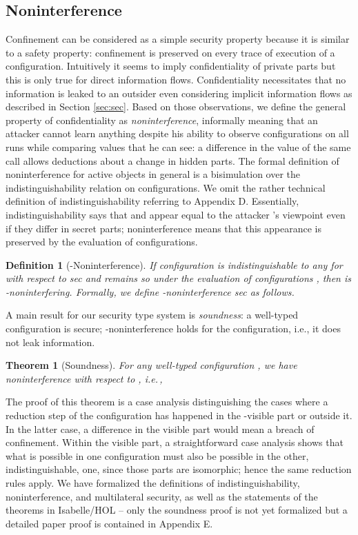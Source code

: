 \documentclass[10pt, conference, compsocconf]{IEEEtran}
\newcommand\ie{i.e.\!\,, }
\newtheorem{theorem}{Theorem}
\newtheorem{definition}{Definition}[section]
\begin{document}
{\subsection{Noninterference}
Confinement can be considered as a simple security property because it 
is similar to a safety property:
confinement is preserved on every trace of execution of a configuration. Intuitively it seems to imply confidentiality of private parts but this is only true 
for direct information flows.
Confidentiality necessitates that no information is leaked to an outsider even considering implicit information flows as 
described in Section \ref{sec:sec}. Based on those observations, we define the general property 
of confidentiality as {\it noninterference}, informally meaning that an attacker cannot learn anything despite
his ability to observe configurations on all runs while comparing values that he can see: a difference
in the value of the same call allows deductions about a change in hidden parts. The formal 
definition of noninterference for active objects in general \cite{kam:12}
is a bisimulation over the indistinguishability 
relation  on configurations. We omit the rather technical definition of indistinguishability 
referring to Appendix D. Essentially, indistinguishability says that  and  appear equal to the 
attacker 's viewpoint  
even if they differ in secret parts; noninterference means that this appearance is preserved by the evaluation of configurations. 
\begin{definition}[-Noninterference]
\label{def:ni}
If configuration  is indistinguishable to any  for  with respect to {\it sec} 
and remains so under the evaluation of configurations , 
then  is -noninterfering.
Formally, we define -noninterference  {\it sec} as follows.

\end{definition}
A main result for our security type system is {\it soundness}: a well-typed configuration is secure; 
-noninterference holds for the configuration, i.e., it does not leak information.
\begin{theorem}[Soundness]
\label{thm:ni}
For any well-typed configuration , 
we have noninterference with respect to , \ie



\end{theorem}
The proof of this theorem is a case analysis distinguishing the 
cases where a reduction step of the configuration has happened 
in the -visible part or outside it. 
In the latter case, a difference in the visible part would mean a breach of confinement.
Within the visible part, a straightforward case analysis shows that what is possible
in one configuration must also be possible in the other, indistinguishable, one, since 
those parts are isomorphic; hence the same reduction rules apply.
We have formalized the definitions of indistinguishability, noninterference, and 
multilateral security, as well as the statements of the theorems in Isabelle/HOL
-- only the soundness proof is not yet formalized but a detailed paper proof is
contained in Appendix E.

}
\end{document}
